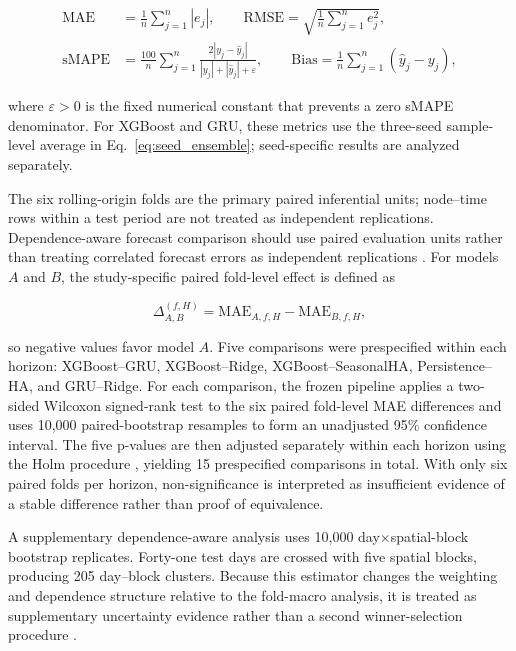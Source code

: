 \documentclass[pdflatex,sn-basic,Numbered]{sn-jnl}
\begin{document}
\begin{equation}
\begin{aligned}
\mathrm{MAE}&=\frac{1}{n}\sum_{j=1}^{n}|e_j|,\qquad
\mathrm{RMSE}=\sqrt{\frac{1}{n}\sum_{j=1}^{n}e_j^2},\\
\mathrm{sMAPE}&=\frac{100}{n}\sum_{j=1}^{n}\frac{2|y_j-\widehat{y}_j|}{|y_j|+|\widehat{y}_j|+\varepsilon},\qquad
\mathrm{Bias}=\frac{1}{n}\sum_{j=1}^{n}(\widehat{y}_j-y_j),
\end{aligned}
\label{eq:evaluation_metrics}
\end{equation}

where $\varepsilon>0$ is the fixed numerical constant that prevents a zero sMAPE denominator. For XGBoost and GRU, these metrics use the three-seed sample-level average in Eq.~\eqref{eq:seed_ensemble}; seed-specific results are analyzed separately.

The six rolling-origin folds are the primary paired inferential units; node--time rows within a test period are not treated as independent replications. Dependence-aware forecast comparison should use paired evaluation units rather than treating correlated forecast errors as independent replications \cite{Hewamalage2023ForecastEvaluation}. For models $A$ and $B$, the study-specific paired fold-level effect is defined as

\begin{equation}
\Delta_{A,B}^{(f,H)}=\mathrm{MAE}_{A,f,H}-\mathrm{MAE}_{B,f,H},
\label{eq:paired_delta}
\end{equation}

so negative values favor model $A$. Five comparisons were prespecified within each horizon: XGBoost--GRU, XGBoost--Ridge, XGBoost--SeasonalHA, Persistence--HA, and GRU--Ridge. For each comparison, the frozen pipeline applies a two-sided Wilcoxon signed-rank test to the six paired fold-level MAE differences and uses 10,000 paired-bootstrap resamples to form an unadjusted 95\% confidence interval. The five p-values are then adjusted separately within each horizon using the Holm procedure \cite{GarciaPerez2023MultipleTesting}, yielding 15 prespecified comparisons in total. With only six paired folds per horizon, non-significance is interpreted as insufficient evidence of a stable difference rather than proof of equivalence.

A supplementary dependence-aware analysis uses 10,000 day$\times$spatial-block bootstrap replicates. Forty-one test days are crossed with five spatial blocks, producing 205 day--block clusters. Because this estimator changes the weighting and dependence structure relative to the fold-macro analysis, it is treated as supplementary uncertainty evidence rather than a second winner-selection procedure \cite{Hewamalage2023ForecastEvaluation}.
\end{document}
